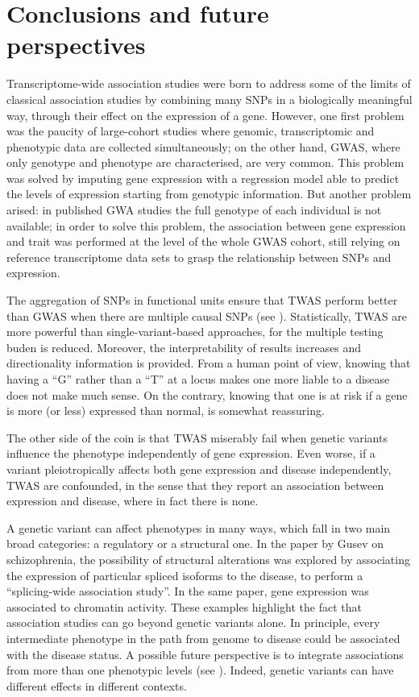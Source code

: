 \documentclass[../main.tex]{subfiles}
\begin{document}
\chapter{Conclusions and future perspectives}

Transcriptome-wide association studies were born to address some of the 
limits of classical association studies by combining many SNPs in a 
biologically meaningful way, \ie through their effect on the expression 
of a gene. However, one first problem was the paucity of large-cohort 
studies where genomic, transcriptomic and phenotypic data are collected 
simultaneously; on the other hand, GWAS, where only genotype and 
phenotype are characterised, are very common. This problem was solved by 
imputing gene expression with a regression model able to predict the 
levels of expression starting from genotypic information. But another 
problem arised: in published GWA studies the full genotype of each 
individual is not available; in order to solve this problem, the 
association between gene expression and trait was performed at the level 
of the whole GWAS cohort, still relying on reference transcriptome data 
sets to grasp the relationship between SNPs and expression.

The aggregation of SNPs in functional units ensure that TWAS perform 
better than GWAS when there are multiple causal SNPs (see 
). Statistically, TWAS are more powerful 
than single-variant-based approaches, for the multiple testing buden is 
reduced. Moreover, the interpretability of results increases and 
directionality information is provided. From a human point of view, 
knowing that having a \enquote{G} rather than a \enquote{T} at a locus 
makes one more liable to a disease does not make much sense. On the 
contrary, knowing that one is at risk if a gene is more (or less) 
expressed than normal, is somewhat reassuring.

The other side of the coin is that TWAS miserably fail when genetic 
variants influence the phenotype independently of gene expression. Even 
worse, if a variant pleiotropically affects both gene expression and 
disease independently, TWAS are confounded, in the sense that they 
report an association between expression and disease, where in fact 
there is none.

A genetic variant can affect phenotypes in many ways, which fall in two 
main broad categories: a regulatory or a structural one. In the paper by 
Gusev \etal on schizophrenia, the possibility of structural alterations 
was explored by associating the expression of particular spliced 
isoforms to the disease, to perform a \enquote{splicing-wide association 
study}. In the same paper, gene expression was associated to chromatin 
activity. These examples highlight the fact that association studies can 
go beyond genetic variants alone. In principle, every intermediate 
phenotype in the path from genome to disease could be associated with 
the disease status. A possible future perspective is to integrate 
associations from more than one phenotypic levels (see 
). Indeed, genetic variants can have different 
effects in different contexts.
\end{document}
